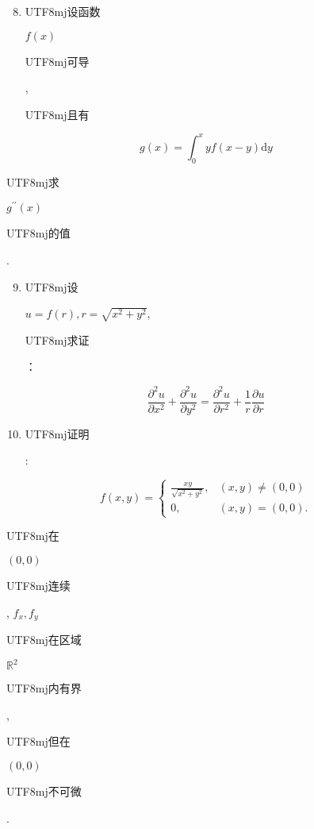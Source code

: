 \documentclass[10pt]{article}
\begin{document}
\begin{enumerate}
  \setcounter{enumi}{7}
  \item \begin{CJK}{UTF8}{mj}设函数\end{CJK} $f(x)$ \begin{CJK}{UTF8}{mj}可导\end{CJK}, \begin{CJK}{UTF8}{mj}且有\end{CJK}
\end{enumerate}
$$
g(x)=\int_{0}^{x} y f(x-y) \mathrm{d} y
$$
\begin{CJK}{UTF8}{mj}求\end{CJK} $g^{\prime \prime}(x)$ \begin{CJK}{UTF8}{mj}的值\end{CJK}.

\begin{enumerate}
  \setcounter{enumi}{8}
  \item \begin{CJK}{UTF8}{mj}设\end{CJK} $u=f(r), r=\sqrt{x^{2}+y^{2}}$, \begin{CJK}{UTF8}{mj}求证\end{CJK}：
\end{enumerate}
$$
\frac{\partial^{2} u}{\partial x^{2}}+\frac{\partial^{2} u}{\partial y^{2}}=\frac{\partial^{2} u}{\partial r^{2}}+\frac{1}{r} \frac{\partial u}{\partial r}
$$

\begin{enumerate}
  \setcounter{enumi}{9}
  \item \begin{CJK}{UTF8}{mj}证明\end{CJK}:
\end{enumerate}
$$
f(x, y)= \begin{cases}\frac{x y}{\sqrt{x^{2}+y^{2}}}, & (x, y) \neq(0,0) \\ 0, & (x, y)=(0,0) .\end{cases}
$$
\begin{CJK}{UTF8}{mj}在\end{CJK} $(0,0)$ \begin{CJK}{UTF8}{mj}连续\end{CJK}, $f_{x}, f_{y}$ \begin{CJK}{UTF8}{mj}在区域\end{CJK} $\mathbb{R}^{2}$ \begin{CJK}{UTF8}{mj}内有界\end{CJK}, \begin{CJK}{UTF8}{mj}但在\end{CJK} $(0,0)$ \begin{CJK}{UTF8}{mj}不可微\end{CJK}.
\end{document}
